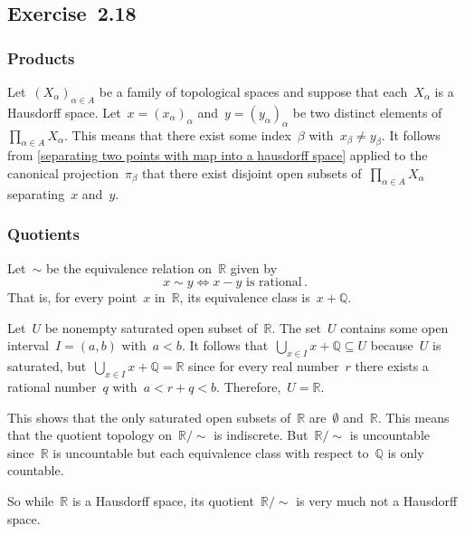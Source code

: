 \subsection{Exercise~2.18}
\label{exercise 2.18}



\subsubsection{Products}

Let~$(X_α)_{α ∈ A}$ be a family of topological spaces and suppose that each~$X_α$ is a Hausdorff space.
Let~$x = (x_α)_α$ and~$y = (y_α)_α$ be two distinct elements of~$∏_{α ∈ A} X_α$.
This means that there exist some index~$β$ with~$x_β ≠ y_β$.
It follows from \cref{separating two points with map into a hausdorff space} applied to the canonical projection~$π_β$ that there exist disjoint open subsets of~$∏_{α ∈ A} X_α$ separating~$x$ and~$y$.



\subsubsection{Quotients}

Let~$∼$ be the equivalence relation on~$ℝ$ given by
\[
	x ∼ y \iff \text{$x - y$ is rational} \,.
\]
That is, for every point~$x$ in~$ℝ$, its equivalence class is~$x + ℚ$.

Let~$U$ be nonempty saturated open subset of~$ℝ$.
The set~$U$ contains some open interval~$I = (a, b)$ with~$a < b$.
It follows that~$⋃_{x ∈ I} x + ℚ ⊆ U$ because~$U$ is saturated, but~$⋃_{x ∈ I} x + ℚ = ℝ$ since for every real number~$r$ there exists a rational number~$q$ with~$a < r + q < b$.
Therefore,~$U = ℝ$.

This shows that the only saturated open subsets of~$ℝ$ are~$∅$ and~$ℝ$.
This means that the quotient topology on~$ℝ / {∼}$ is indiscrete.
But~$ℝ / {∼}$ is uncountable since~$ℝ$ is uncountable but each equivalence class with respect to~$ℚ$ is only countable.

So while~$ℝ$ is a Hausdorff space, its quotient~$ℝ / {∼}$ is very much not a Hausdorff space.
